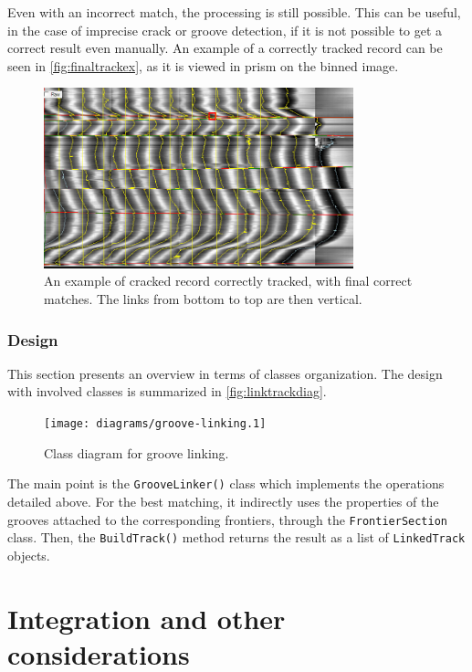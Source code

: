 Even with an incorrect match, the processing is still possible. This can be useful, in the case of imprecise crack or groove detection, if it is not possible to get a correct result even manually. An example of a correctly tracked record can be seen in \autoref{fig:finaltrackex}, as it is viewed in \gls{prism} on the binned image.

\begin{figure}[!ht]
\centering
\includegraphics[width=0.8\textwidth]{images/final-track-ex}
\caption[An example of cracked record tracked.]
{An example of cracked record correctly tracked, with final correct matches. The links from bottom to top are then vertical.}
\label{fig:finaltrackex}
\end{figure}

\subsubsection{Design}

This section presents an overview in terms of classes organization. The design with involved classes is summarized in \autoref{fig:linktrackdiag}.

\begin{figure}[!ht]
\centering
\texttt{[image: diagrams/groove-linking.1]}
\caption{Class diagram for groove linking.}
\label{fig:linktrackdiag}
\end{figure}

The main point is the \texttt{GrooveLinker()} class which implements the operations detailed above. For the best matching, it indirectly uses the properties of the grooves attached to the corresponding frontiers, through the \texttt{FrontierSection} class. Then, the \texttt{BuildTrack()} method returns the result as a list of \texttt{LinkedTrack} objects.

\section{Integration and other considerations}

